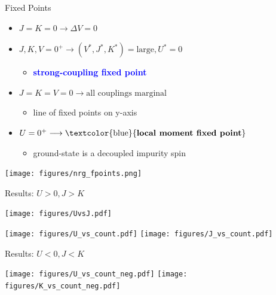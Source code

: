 \documentclass[aspectratio=169]{beamer}
\newcommand{\focus}[1]{\textcolor{blue}{\textbf{#1}}}
\newcommand{\cen}[1]{\begin{center}{#1}\end{center}}
\begin{document}
\begin{frame}{Fixed Points}
\begin{minipage}{0.6\textwidth}
	\begin{itemize}
		\item \(J=K=0 \longrightarrow \Delta V = 0\)
			\vspace*{20pt}
		\item \(J,K,V=0^+ \longrightarrow \left(V^*, J^*, K^*\right)=\text{large}, U^*=0\)
			\begin{itemize}
				\item \focus{strong-coupling fixed point}
			\end{itemize}
			\vspace*{20pt}
		\item \(J=K=V=0 \longrightarrow \text{all couplings marginal}\)
			\begin{itemize}
				\item line of fixed points on y-axis
			\end{itemize}
			\vspace*{20pt}
		\item \(U=0^+ \longrightarrow \text{\focus{local moment fixed point}}\)
			\begin{itemize}
				\item ground-state is a decoupled impurity spin
			\end{itemize}
	\end{itemize}
\end{minipage}
\begin{minipage}{0.38\textwidth}
	\centering
	\texttt{[image: figures/nrg\_fpoints.png]}
\end{minipage}
	
\end{frame}
\begin{frame}[noframenumbering]{Results: \(U>0, J>K\)}
\begin{minipage}{0.6\textwidth}
\cen{
	\texttt{[image: figures/UvsJ.pdf]}
}
\end{minipage}
\begin{minipage}{0.39\textwidth}
\cen{
	\texttt{[image: figures/U\_vs\_count.pdf]}
	\texttt{[image: figures/J\_vs\_count.pdf]}
}
\end{minipage}
\end{frame}


\begin{frame}[noframenumbering]{Results: \(U<0, J<K\)}
	\vspace*{30pt}
\cen{
	\texttt{[image: figures/U\_vs\_count\_neg.pdf]}
	\texttt{[image: figures/K\_vs\_count\_neg.pdf]}
}
\end{frame}
\end{document}
